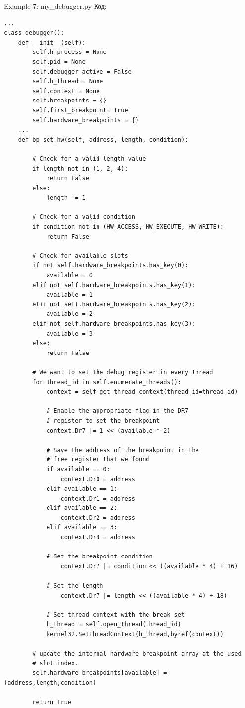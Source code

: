 \documentclass[12pt]{book}
\begin{document}
Example 7: my\_debugger.py
Код:
\begin{lstlisting}
...
class debugger():
    def __init__(self):
        self.h_process = None
        self.pid = None
        self.debugger_active = False
        self.h_thread = None
        self.context = None
        self.breakpoints = {}
        self.first_breakpoint= True
        self.hardware_breakpoints = {}
    ...
    def bp_set_hw(self, address, length, condition):

        # Check for a valid length value
        if length not in (1, 2, 4):
            return False
        else:
            length -= 1

        # Check for a valid condition
        if condition not in (HW_ACCESS, HW_EXECUTE, HW_WRITE):
            return False

        # Check for available slots
        if not self.hardware_breakpoints.has_key(0):
            available = 0
        elif not self.hardware_breakpoints.has_key(1):
            available = 1
        elif not self.hardware_breakpoints.has_key(2):
            available = 2
        elif not self.hardware_breakpoints.has_key(3):
            available = 3
        else:
            return False

        # We want to set the debug register in every thread
        for thread_id in self.enumerate_threads():
            context = self.get_thread_context(thread_id=thread_id)

            # Enable the appropriate flag in the DR7
            # register to set the breakpoint
            context.Dr7 |= 1 << (available * 2)

            # Save the address of the breakpoint in the
            # free register that we found
            if available == 0:
                context.Dr0 = address
            elif available == 1:
                context.Dr1 = address
            elif available == 2:
                context.Dr2 = address
            elif available == 3:
                context.Dr3 = address

            # Set the breakpoint condition
                context.Dr7 |= condition << ((available * 4) + 16)

            # Set the length
                context.Dr7 |= length << ((available * 4) + 18)

            # Set thread context with the break set
            h_thread = self.open_thread(thread_id)
            kernel32.SetThreadContext(h_thread,byref(context))

        # update the internal hardware breakpoint array at the used
        # slot index.
        self.hardware_breakpoints[available] = (address,length,condition)

        return True
\end{lstlisting}
\end{document}
